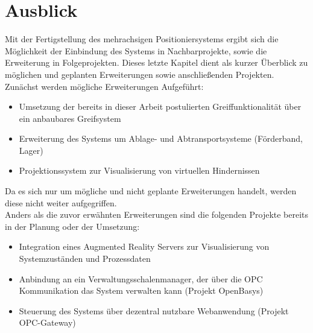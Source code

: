 \documentclass[../../Bachelorarbeit.tex]{subfiles}
\begin{document}
\section{Ausblick}
Mit der Fertigstellung des mehrachsigen Positioniersystems ergibt sich die Möglichkeit der Einbindung des Systems in Nachbarprojekte, sowie die Erweiterung in Folgeprojekten. Dieses letzte Kapitel dient als kurzer Überblick zu möglichen und geplanten Erweiterungen sowie anschließenden Projekten.\\
Zunächst werden mögliche Erweiterungen Aufgeführt:

\begin{itemize}
    \item Umsetzung der bereits in dieser Arbeit postulierten Greiffunktionalität über ein anbaubares Greifsystem
    \item Erweiterung des Systems um Ablage- und Abtransportsysteme (\zB Förderband, Lager)
    \item Projektionssystem zur Visualisierung von virtuellen Hindernissen
\end{itemize}

Da es sich nur um mögliche und nicht geplante Erweiterungen handelt, werden diese nicht weiter aufgegriffen.\\
\bigskip \newline
Anders als die zuvor erwähnten Erweiterungen sind die folgenden Projekte bereits in der Planung oder der Umsetzung:

\begin{itemize}
    \item Integration eines Augmented Reality Servers zur Visualisierung von Systemzuständen und Prozessdaten
    \item Anbindung an ein Verwaltungsschalenmanager, der über die OPC Kommunikation das System verwalten kann (Projekt OpenBasys)
    \item Steuerung des Systems über dezentral nutzbare Webanwendung (Projekt OPC-Gateway)
\end{itemize}
\end{document}
